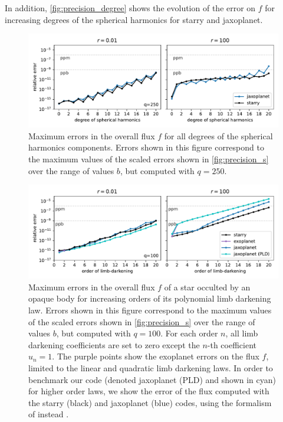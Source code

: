 \documentclass[modern]{aastex631}
\begin{document}
In addition, \autoref{fig:precision_degree} shows the evolution of the error on $f$ for increasing degrees of the spherical harmonics for \textsf{starry} and \textsf{jaxoplanet}.
\begin{figure}[H]
    \begin{center}
        \includegraphics[width=\textwidth]{../workflows/precision/figures/error_degree.pdf}
        \caption{Maximum errors in the overall flux $f$ for all degrees of the spherical harmonics components. Errors shown in this figure correspond to the maximum values of the scaled errors shown in \autoref{fig:precision_s} over the range of values $b$, but computed with $q=250$. }
        \label{fig:precision_degree}
    \end{center}
\end{figure}
\begin{figure}[H]
    \begin{center}
        \includegraphics[width=\textwidth]{../workflows/precision/figures/limbdark_error.PDF}
        \caption{Maximum errors in the overall flux $f$ of a star occulted by an opaque body for increasing orders of its polynomial limb darkening law. Errors shown in this figure correspond to the maximum values of the scaled errors shown in \autoref{fig:precision_s} over the range of values $b$, but computed with $q=100$. For each order $n$, all limb darkening coefficients are set to zero except the $n$-th coefficient $u_n=1$. The purple points show the \textsf{exoplanet} errors on the flux $f$, limited to the linear and quadratic limb darkening laws. In order to benchmark our code (denoted \textsf{jaxoplanet (PLD)} and shown in cyan) for higher order laws, we show the error of the flux computed with the \textsf{starry} (black) and \textsf{jaxoplanet} (blue) codes, using the formalism of \cite{starry} instead \cite{Agol2020}. }
        \label{fig:precision_limbdark}
    \end{center}
\end{figure}
\end{document}
